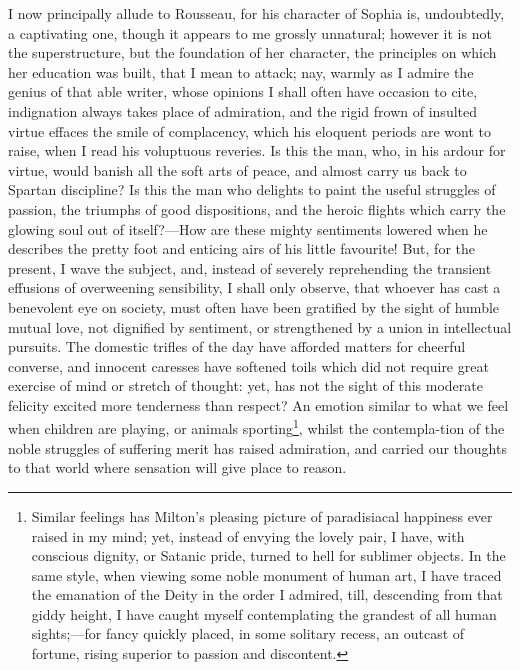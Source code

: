 
I now principally allude to Rousseau, for his character of Sophia is,
undoubtedly, a captivating one, though it appears to me grossly
unnatural; however it is not the superstructure, but the foundation of
her character, the principles on which her education was built, that I
mean to attack; nay, warmly as I admire the genius of that able
writer, whose opinions I shall often have occasion to cite,
indignation always takes place of admiration, and the rigid frown of
insulted virtue effaces the smile of complacency, which his eloquent
periods are wont to raise, when I read his voluptuous reveries. Is
this the man, who, in his ardour for virtue, would banish all the soft
arts of peace, and almost carry us back to Spartan discipline? Is this
the man who delights to paint the useful struggles of passion, the
triumphs  of good dispositions, and the heroic flights which
carry the glowing soul out of itself?---How are these mighty
sentiments lowered when he describes the pretty foot and enticing airs
of his little favourite! But, for the present, I wave the subject,
and, instead of severely reprehending the transient effusions of
overweening sensibility, I shall only observe, that whoever has cast a
benevolent eye on society, must often have been gratified by the sight
of humble mutual love, not dignified by sentiment, or strengthened by
a union in intellectual pursuits. The domestic trifles of the day have
afforded matters for cheerful converse, and innocent caresses have
softened toils which did not require great exercise of mind or stretch
of thought: yet, has not the sight of this moderate felicity excited
more tenderness than respect? An emotion similar to what we feel when
children are playing, or animals sporting\footnote{Similar feelings
has Milton's pleasing picture of paradisiacal happiness ever raised in
my mind; yet, instead of envying the lovely pair, I have, with
conscious dignity, or Satanic pride, turned to hell for sublimer
objects. In the same style, when viewing some noble monument of human
art, I have traced the emanation of the Deity in the order I admired,
till, descending from that giddy height, I have caught myself
contemplating the grandest of all human sights;---for fancy quickly
placed, in some solitary recess, an outcast of fortune, rising
superior to passion and discontent.}, whilst the
contempla-tion of the noble struggles of suffering merit has
raised admiration, and carried our thoughts to that world where
sensation will give place to reason.

